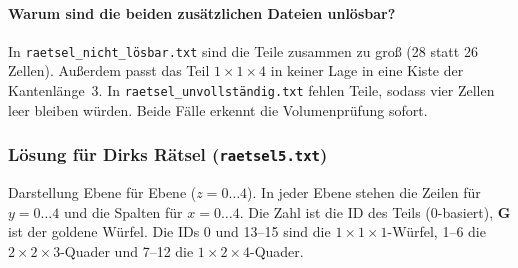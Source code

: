 \documentclass[11pt,a4paper,parskip=half]{scrartcl}
\newcommand{\file}[1]{\texttt{#1}}
\begin{document}
\paragraph{Warum sind die beiden zusätzlichen Dateien unlösbar?}
In \file{raetsel\_nicht\_lösbar.txt} sind die Teile zusammen zu groß (28 statt 26
Zellen). Außerdem passt das Teil $1\times1\times4$ in keiner Lage in eine Kiste der
Kantenlänge~3. In \file{raetsel\_unvollständig.txt} fehlen Teile, sodass vier Zellen
leer bleiben würden. Beide Fälle erkennt die Volumenprüfung sofort.

\subsubsection*{Lösung für Dirks Rätsel (\file{raetsel5.txt})}

Darstellung Ebene für Ebene ($z = 0 \dots 4$). In jeder Ebene stehen die Zeilen für
$y = 0 \dots 4$ und die Spalten für $x = 0 \dots 4$. Die Zahl ist die ID des Teils
(0-basiert), \colorbox{goldcol}{\textbf{G}} ist der goldene Würfel. Die IDs 0 und
13--15 sind die $1\times1\times1$-Würfel, 1--6 die $2\times2\times3$-Quader und 7--12
die $1\times2\times4$-Quader.
\end{document}
